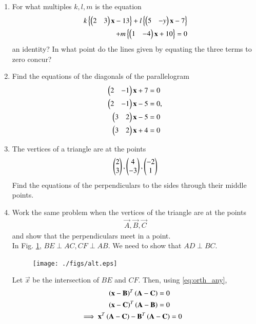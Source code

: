 \begin{enumerate}[label=\arabic*.,ref=\thesubsection.\theenumi]
\item For what multiples $k, l, m$ is the equation
\begin{align}
k\left\{\begin{pmatrix}2&3\end{pmatrix}\mathbf{x}-13\right\}+l\left\{\begin{pmatrix}5& -y\end{pmatrix}\mathbf{x}-7\right\} 
\nonumber \\ 
+ m\left\{\begin{pmatrix}1 &-4\end{pmatrix}\mathbf{x}+10\right\} = 0
\end{align}
an identity?  In what point do the lines given by equating the three terms to zero concur?
\item Find the equations of the diagonals of the parallelogram
\begin{align}
\begin{pmatrix}2&-1\end{pmatrix} \mathbf{x}+7&= 0
\\
\begin{pmatrix} 2 &-1\end{pmatrix}\mathbf{x}-5 &= 0,
\\
\begin{pmatrix} 3 &2\end{pmatrix}\mathbf{x}-5 &= 0
\\
\begin{pmatrix} 3 &2\end{pmatrix}\mathbf{x}+4&=0 
\end{align}
\renewcommand{\theequation}{\theenumi}
\item The vertices of a triangle are at the points
\begin{align}
\begin{pmatrix}2\\3\end{pmatrix}, \begin{pmatrix}4\\-3\end{pmatrix}, \begin{pmatrix}-2\\1\end{pmatrix}
\end{align}
Find the equations of the perpendiculars to the sides through their middle points.
\item Work the same problem when the vertices of the triangle are at the points
\begin{align}
\vec{A},
\vec{B},
\vec{C}
\end{align}
and show that the perpendiculars meet in a point.
\\%
\solution In Fig. \ref{fig:alt}, $BE \perp AC, CF \perp AB$.  We need to show that $AD \perp BC$.
\begin{figure}[!hb]
\centering
\texttt{[image: ./figs/alt.eps]}
\caption{}
\label{fig:alt}
\end{figure}
 Let $\vec{x}$ be the intersection of $BE$ and $CF$. Then, using 
\eqref{eq:orth_any},
\begin{align}
\label{eq:alt_1}
\begin{split}
\brak{\vec{x}-\vec{B}}^T
\brak{\vec{A}-\vec{C}} &= 0
\\
\brak{\vec{x}-\vec{C}}^T
\brak{\vec{A}-\vec{B}} &=0
\end{split}
\\
\label{eq:alt_3}
\implies \vec{x}^T\brak{\vec{A}-\vec{C}}-\vec{B}^T\brak{\vec{A}-\vec{C}} &= 0
\\

\end{align}
\end{enumerate}
